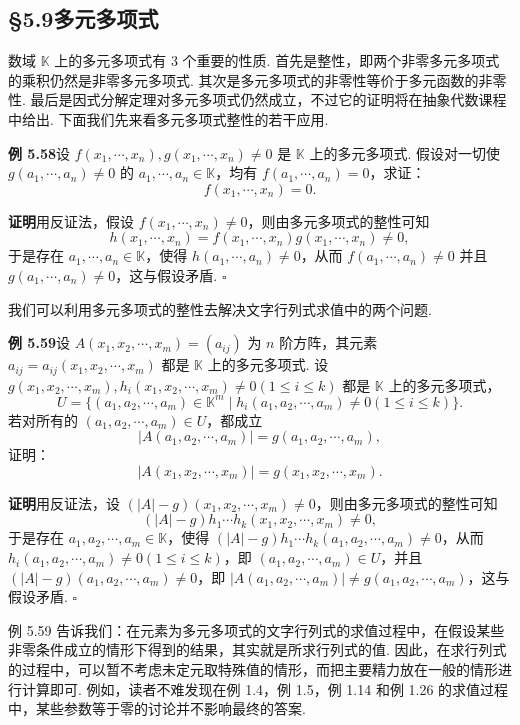 \documentclass[UTF8, 12pt, fontset=fandol, oneside]{ctexart}
\begin{document}
\subsection*{§5.9\quad 多元多项式}

数域 $\mathbb{K}$ 上的多元多项式有 3 个重要的性质. 首先是整性，即两个非零多元多项式的乘积仍然是非零多元多项式. 其次是多元多项式的非零性等价于多元函数的非零性. 最后是因式分解定理对多元多项式仍然成立，不过它的证明将在抽象代数课程中给出. 下面我们先来看多元多项式整性的若干应用.

\noindent\textbf{例 5.58}\quad 设 $f(x_1,\cdots,x_n),g(x_1,\cdots,x_n)\ne0$ 是 $\mathbb{K}$ 上的多元多项式. 假设对一切使 $g(a_1,\cdots,a_n)\ne0$ 的 $a_1,\cdots,a_n\in\mathbb{K}$，均有 $f(a_1,\cdots,a_n)=0$，求证：
\[
f(x_1,\cdots,x_n)=0.
\]

\noindent\textbf{证明}\quad 用反证法，假设 $f(x_1,\cdots,x_n)\ne0$，则由多元多项式的整性可知
\[
h(x_1,\cdots,x_n)=f(x_1,\cdots,x_n)g(x_1,\cdots,x_n)\ne0,
\]
于是存在 $a_1,\cdots,a_n\in\mathbb{K}$，使得 $h(a_1,\cdots,a_n)\ne0$，从而 $f(a_1,\cdots,a_n)\ne0$ 并且 $g(a_1,\cdots,a_n)\ne0$，这与假设矛盾. \hfill $\square$

我们可以利用多元多项式的整性去解决文字行列式求值中的两个问题.

\noindent\textbf{例 5.59}\quad 设 $A(x_1,x_2,\cdots,x_m)=(a_{ij})$ 为 $n$ 阶方阵，其元素 $a_{ij}=a_{ij}(x_1,x_2,\cdots,x_m)$ 都是 $\mathbb{K}$ 上的多元多项式. 设 $g(x_1,x_2,\cdots,x_m),h_i(x_1,x_2,\cdots,x_m)\ne0(1\le i\le k)$ 都是 $\mathbb{K}$ 上的多元多项式，
\[
U=\{(a_1,a_2,\cdots,a_m)\in\mathbb{K}^m\mid h_i(a_1,a_2,\cdots,a_m)\ne0(1\le i\le k)\}.
\]
若对所有的 $(a_1,a_2,\cdots,a_m)\in U$，都成立
\[
|A(a_1,a_2,\cdots,a_m)|=g(a_1,a_2,\cdots,a_m),
\]
证明：
\[
|A(x_1,x_2,\cdots,x_m)|=g(x_1,x_2,\cdots,x_m).
\]

\noindent\textbf{证明}\quad 用反证法，设 $(|A|-g)(x_1,x_2,\cdots,x_m)\ne0$，则由多元多项式的整性可知
\[
(|A|-g)h_1\cdots h_k(x_1,x_2,\cdots,x_m)\ne0,
\]
于是存在 $a_1,a_2,\cdots,a_m\in\mathbb{K}$，使得 $(|A|-g)h_1\cdots h_k(a_1,a_2,\cdots,a_m)\ne0$，从而 $h_i(a_1,a_2,\cdots,a_m)\ne0(1\le i\le k)$，即 $(a_1,a_2,\cdots,a_m)\in U$，并且 $(|A|-g)(a_1,a_2,\cdots,a_m)\ne0$，即 $|A(a_1,a_2,\cdots,a_m)|\ne g(a_1,a_2,\cdots,a_m)$，这与假设矛盾. \hfill $\square$

例 5.59 告诉我们：在元素为多元多项式的文字行列式的求值过程中，在假设某些非零条件成立的情形下得到的结果，其实就是所求行列式的值. 因此，在求行列式的过程中，可以暂不考虑未定元取特殊值的情形，而把主要精力放在一般的情形进行计算即可. 例如，读者不难发现在例 1.4，例 1.5，例 1.14 和例 1.26 的求值过程中，某些参数等于零的讨论并不影响最终的答案.
\end{document}
